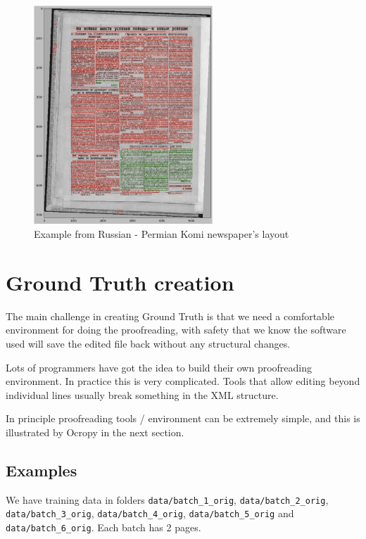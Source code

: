 \documentclass[]{book}
\begin{document}
\begin{figure}
\centering
\includegraphics[width=0.6\textwidth,height=\textheight]{images/calamari_script_detector.jpg}
\caption{Example from Russian - Permian Komi newspaper's layout}
\end{figure}

\hypertarget{ground-truth}{%
\chapter{Ground Truth creation}\label{ground-truth}}

The main challenge in creating Ground Truth is that we need a comfortable environment for doing the proofreading, with safety that we know the software used will save the edited file back without any structural changes.

Lots of programmers have got the idea to build their own proofreading environment. In practice this is very complicated. Tools that allow editing beyond individual lines usually break something in the XML structure.

In principle proofreading tools / environment can be extremely simple, and this is illustrated by Ocropy in the next section.

\hypertarget{examples}{%
\section{Examples}\label{examples}}

We have training data in folders \texttt{data/batch\_1\_orig}, \texttt{data/batch\_2\_orig}, \texttt{data/batch\_3\_orig}, \texttt{data/batch\_4\_orig}, \texttt{data/batch\_5\_orig} and \texttt{data/batch\_6\_orig}. Each batch has 2 pages.
\end{document}
